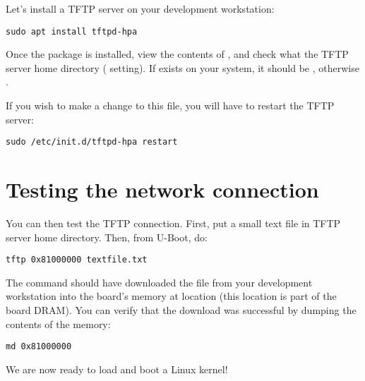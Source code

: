 Let's install a TFTP server on your development workstation:

\begin{verbatim}
sudo apt install tftpd-hpa
\end{verbatim}

Once the package is installed, view the contents of
, and check what the TFTP server home directory
( setting). If  exists on your system,
it should be , otherwise .

If you wish to make a change to this file, you will have to restart the TFTP server:

\begin{verbatim}
sudo /etc/init.d/tftpd-hpa restart
\end{verbatim}

\section{Testing the network connection}

You can then test the TFTP connection.  First, put a small text
file in TFTP server home directory. Then, from U-Boot, do:

\begin{verbatim}
tftp 0x81000000 textfile.txt
\end{verbatim}

The  command should have downloaded the
 file from your development workstation into the
board's memory at location  (this location is part of
the board DRAM). You can verify that the download was successful by
dumping the contents of the memory:

\begin{verbatim}
md 0x81000000
\end{verbatim}

We are now ready to load and boot a Linux kernel!
